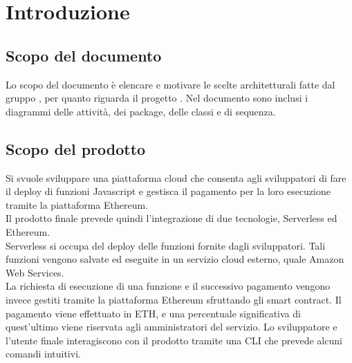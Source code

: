 \section{Introduzione}
\subsection{Scopo del documento}
	Lo scopo del documento è elencare e motivare le scelte architetturali fatte dal gruppo \Gruppo{}, per quanto riguarda il progetto \NomeProgetto{}. Nel documento sono inclusi i diagrammi delle attività, dei package, delle classi e di sequenza.
\subsection{Scopo del prodotto}
	Si svuole sviluppare una piattaforma cloud che consenta agli sviluppatori di fare il deploy di funzioni Javascript e gestisca il pagamento per la loro esecuzione tramite la piattaforma Ethereum.\\
	Il prodotto finale prevede quindi l'integrazione di due tecnologie, Serverless ed Ethereum.\\
	Serverless si occupa del deploy delle funzioni fornite dagli sviluppatori. Tali funzioni vengono salvate ed eseguite in un servizio cloud esterno, quale Amazon Web Services.  \\La richiesta di esecuzione di una funzione e il successivo pagamento vengono invece gestiti tramite la piattaforma Ethereum sfruttando gli smart contract. Il pagamento viene effettuato in ETH, e una percentuale significativa di quest'ultimo viene riservata agli amministratori del servizio.
	Lo sviluppatore e l'utente finale interagiscono con il prodotto tramite una CLI che prevede alcuni comandi intuitivi.

